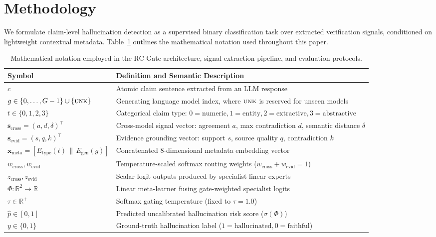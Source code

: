 \documentclass[pdflatex,sn-mathphys,Numbered]{sn-jnl}
\begin{document}
\section{Methodology}\label{sec:method}

We formulate claim-level hallucination detection as a supervised binary classification task over extracted verification signals, conditioned on lightweight contextual metadata. Table~\ref{tab:notation} outlines the mathematical notation used throughout this paper.

\begin{table}[htbp]
\caption{Mathematical notation employed in the RC-Gate architecture, signal extraction pipeline, and evaluation protocols.}\label{tab:notation}
\footnotesize
\setlength{\tabcolsep}{4pt}
\begin{tabular}{@{}ll@{}}
\toprule
\textbf{Symbol} & \textbf{Definition and Semantic Description} \\
\midrule
$c$ & Atomic claim sentence extracted from an LLM response \\
$g \in \{0, \dots, G-1\} \cup \{\textsc{unk}\}$ & Generating language model index, where $\textsc{unk}$ is reserved for unseen models \\
$t \in \{0, 1, 2, 3\}$ & Categorical claim type: $0=\text{numeric}, 1=\text{entity}, 2=\text{extractive}, 3=\text{abstractive}$ \\
$\mathbf{s}_{\mathrm{cross}} = (a, d, \delta)^{\top}$ & Cross-model signal vector: agreement $a$, max contradiction $d$, semantic distance $\delta$ \\
$\mathbf{s}_{\mathrm{evid}} = (s, q, k)^{\top}$ & Evidence grounding vector: support $s$, source quality $q$, contradiction $k$ \\
$\mathbf{x}_{\mathrm{meta}} = [E_{\mathrm{type}}(t) \,\|\, E_{\mathrm{gen}}(g)]$ & Concatenated 8-dimensional metadata embedding vector \\
$w_{\mathrm{cross}}, w_{\mathrm{evid}}$ & Temperature-scaled softmax routing weights ($w_{\mathrm{cross}} + w_{\mathrm{evid}} = 1$) \\
$z_{\mathrm{cross}}, z_{\mathrm{evid}}$ & Scalar logit outputs produced by specialist linear experts \\
$\Phi: \mathbb{R}^2 \to \mathbb{R}$ & Linear meta-learner fusing gate-weighted specialist logits \\
$\tau \in \mathbb{R}^+$ & Softmax gating temperature (fixed to $\tau=1.0$) \\
$\hat{p} \in [0, 1]$ & Predicted uncalibrated hallucination risk score ($\sigma(\Phi)$) \\
$y \in \{0, 1\}$ & Ground-truth hallucination label ($1=\text{hallucinated}, 0=\text{faithful}$) \\
\bottomrule
\end{tabular}
\end{table}
\end{document}

